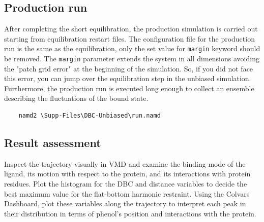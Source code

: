 \documentclass[9pt,tutorial]{livecoms}
\begin{document}
\subsection{Production run}\label{section 6.4}
After completing the short equilibration, the production simulation is carried out starting from equilibration restart files. The configuration file for the production run is the same as the equilibration, only the set value for \texttt{margin} keyword should be removed. The \texttt{margin} parameter extends the system in all dimensions avoiding the "patch grid error" at the beginning of the simulation. So, if you did not face this error, you can jump over the equilibration step in the unbiased simulation. Furthermore, the production run is executed long enough to collect an ensemble describing the fluctuations of the bound state.
\begin{verbatim}
    namd2 \Supp-Files\DBC-Unbiased\run.namd
\end{verbatim}

\subsection{Result assessment}

Inspect the trajectory visually in VMD and examine the binding mode of the ligand, its motion with respect to the protein, and its interactions with  protein residues.
Plot the histogram for the DBC and distance variables to decide the best maximum value for the flat-bottom harmonic restraint.
Using the Colvars Dashboard, plot these variables along the trajectory to interpret each peak in their distribution in terms of phenol's position and interactions with the protein.

\end{document}
